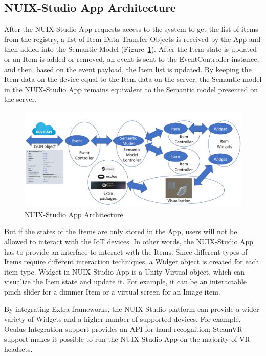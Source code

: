 \subsection{NUIX-Studio App Architecture}

After the NUIX-Studio App requests access to the system to get the list of items from the registry, a list of Item Data Transfer Objects is received by the App and then added into the Semantic Model (Figure~\ref{fig:AppArchitecture-figure}). After the Item state is updated or an Item is added or removed, an event is sent to the EventController instance, and then, based on the event payload, the Item list is updated.  By keeping the Item data on the device equal to the Item data on the server, the Semantic model in the NUIX-Studio App remains equivalent to the Semantic model presented on the server. 

\begin{figure}
  \centering
  \includegraphics[width=0.9\linewidth]{figures/AppArchitecture.png}
  \caption{NUIX-Studio App Architecture}
  \label{fig:AppArchitecture-figure}
\end{figure}

But if the states of the Items are only stored in the App, users will not be allowed to interact with the IoT devices. In other words, the NUIX-Studio App has to provide an interface to interact with the Items. Since different types of Items require different interaction techniques, a Widget object is created for each item type.
Widget in NUIX-Studio App is a Unity Virtual object, which can visualize the Item state and update it. For example, it can be an interactable pinch slider for a dimmer Item or a virtual screen for an Image item.

By integrating Extra frameworks, the NUIX-Studio platform can provide a wider variety of Widgets and a higher number of supported devices. For example, Oculus Integration support provides an API for hand recognition; SteamVR~\cite{SteamVR2021} support makes it possible to run the NUIX-Studio App on the majority of VR headsets.

